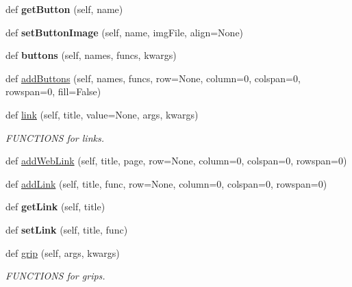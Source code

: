 \begin{DoxyCompactItemize}
def {\bfseries get\+Button} (self, name)
\item 
\mbox{\label{class_python_01_g_u_i_1_1appjar_1_1gui_af92c6617a4c05ca02500c1083f4db5c4}} 
def {\bfseries set\+Button\+Image} (self, name, img\+File, align=None)
\item 
\mbox{\label{class_python_01_g_u_i_1_1appjar_1_1gui_a31376c020a1f1331067db52aa99b69f0}} 
def {\bfseries buttons} (self, names, funcs, kwargs)
\item 
def \hyperlink{class_python_01_g_u_i_1_1appjar_1_1gui_abe1681705b905fe66678f7566489240c}{add\+Buttons} (self, names, funcs, row=None, column=0, colspan=0, rowspan=0, fill=False)
\item 
def \hyperlink{class_python_01_g_u_i_1_1appjar_1_1gui_a0573d466339a8c064982ae5e94673835}{link} (self, title, value=None, args, kwargs)
\begin{DoxyCompactList}\small\item\em F\+U\+N\+C\+T\+I\+O\+NS for links. \end{DoxyCompactList}\item 
def \hyperlink{class_python_01_g_u_i_1_1appjar_1_1gui_aff406851f99c330dd2adadc32a9e50e8}{add\+Web\+Link} (self, title, page, row=None, column=0, colspan=0, rowspan=0)
\item 
def \hyperlink{class_python_01_g_u_i_1_1appjar_1_1gui_a2ac0d91bddfc0624e49c17f45064993b}{add\+Link} (self, title, func, row=None, column=0, colspan=0, rowspan=0)
\item 
\mbox{\label{class_python_01_g_u_i_1_1appjar_1_1gui_adc9ee7cffc1c1a48a962db9e326a0991}} 
def {\bfseries get\+Link} (self, title)
\item 
\mbox{\label{class_python_01_g_u_i_1_1appjar_1_1gui_af86a06e9117ead3134bac325d74a57ea}} 
def {\bfseries set\+Link} (self, title, func)
\item 
def \hyperlink{class_python_01_g_u_i_1_1appjar_1_1gui_a911fe03dc7db69b2b073909996569841}{grip} (self, args, kwargs)
\begin{DoxyCompactList}\small\item\em F\+U\+N\+C\+T\+I\+O\+NS for grips. \end{DoxyCompactList}\item 

\end{DoxyCompactItemize}

